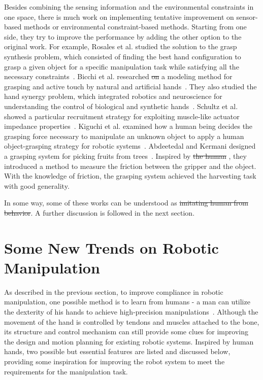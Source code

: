\documentclass[journal,twoside,web]{ieeecolor}
\providecommand{\DIFadd}[1]{{\protect\color{blue}\uwave{#1}}} %
\providecommand{\DIFdel}[1]{{\protect\color{red}\sout{#1}}}                      %
\providecommand{\DIFaddbegin}{} %
\providecommand{\DIFaddend}{} %
\providecommand{\DIFdelbegin}{} %
\providecommand{\DIFdelend}{} %
\newcommand{\DIFscaledelfig}{0.5}
\newlength{\DIFdelgraphicswidth} %
\newlength{\DIFdelgraphicsheight} %
\newcommand{\DIFaddincludegraphics}[2][]{{\color{blue}\fbox{\DIFOincludegraphics[#1]{#2}}}} %
\newcommand{\DIFdelincludegraphics}[2][]{%
\sbox{\DIFdelgraphicsbox}{\DIFOincludegraphics[#1]{#2}}%
\settoboxwidth{\DIFdelgraphicswidth}{\DIFdelgraphicsbox} %
\settoboxtotalheight{\DIFdelgraphicsheight}{\DIFdelgraphicsbox} %
\scalebox{\DIFscaledelfig}{%
\parbox[b]{\DIFdelgraphicswidth}{\usebox{\DIFdelgraphicsbox}\\[-\baselineskip] \rule{\DIFdelgraphicswidth}{0em}}\llap{\resizebox{\DIFdelgraphicswidth}{\DIFdelgraphicsheight}{%
\setlength{\unitlength}{\DIFdelgraphicswidth}%
\begin{picture}(1,1)%
\thicklines\linethickness{2pt} %
{\color[rgb]{1,0,0}\put(0,0){\framebox(1,1){}}}%
{\color[rgb]{1,0,0}\put(0,0){\line( 1,1){1}}}%
{\color[rgb]{1,0,0}\put(0,1){\line(1,-1){1}}}%
\end{picture}%
}\hspace*{3pt}}} %
} %
\DeclareRobustCommand{\DIFaddbegin}{\DIFOaddbegin \let\includegraphics\DIFaddincludegraphics} %
\DeclareRobustCommand{\DIFaddend}{\DIFOaddend \let\includegraphics\DIFOincludegraphics} %
\DeclareRobustCommand{\DIFdelbegin}{\DIFOdelbegin \let\includegraphics\DIFdelincludegraphics} %
\DeclareRobustCommand{\DIFdelend}{\DIFOaddend \let\includegraphics\DIFOincludegraphics} %
\begin{document}
Besides combining the sensing information and the environmental constraints in one space, there is much work on implementing tentative improvement on sensor-based methods or environmental constraint-based methods. Starting from one side, they try to improve the performance by adding the other option to the original work. 
For example, 
Rosales et al. studied the solution to the grasp synthesis problem, which consisted of finding the best hand configuration to grasp a given object for a specific manipulation task while satisfying all the necessary constraints~\cite{Rosales2012}.
Bicchi et al. researched \DIFdelbegin \DIFdel{on }\DIFdelend a modeling method for grasping and active touch by natural and artificial hands~\cite{Bicchi2011}.
They also studied the hand synergy problem, which integrated robotics and neuroscience for understanding the control of biological and synthetic hands~\cite{Santello2016}.
Schultz et al. showed a particular recruitment strategy for exploiting muscle-like actuator impedance properties~\cite{Schultz2015}.
Kiguchi et al. examined how a human being decides the grasping force necessary to manipulate an unknown object to apply a human object-grasping strategy for robotic systems~\cite{Kiguchi2003}.
Abdeetedal and Kermani designed a grasping system for picking fruits from trees~\cite{Abdeetedal2018}. Inspired by \DIFdelbegin \DIFdel{the human }\DIFdelend \DIFaddbegin \DIFadd{human biology}\DIFaddend , they introduced a method to measure the friction between the gripper and the object. With the knowledge of friction, the grasping system achieved the harvesting task with good generality.

In some way, some of these works can be understood as \DIFdelbegin \DIFdel{imitating human from behavior}\DIFdelend \DIFaddbegin \DIFadd{biomimetics}\DIFaddend . A further discussion is followed in the next section.

\section{Some New Trends on Robotic Manipulation}
\label{sec:compliant_advanced}

As described in the previous section, to improve compliance in robotic manipulation, one possible method is to learn from humans - a man can utilize the dexterity of his hands to achieve high-precision manipulations~\cite{Wu2015}. 
Although the movement of the hand is controlled by tendons and muscles attached to the bone, its structure and control mechanism can still provide some clues for improving the design and motion planning for existing robotic systems. 
Inspired by human hands, two possible but essential features are listed and discussed below, providing some inspiration for improving the robot system to meet the requirements for the manipulation task.
\end{document}

